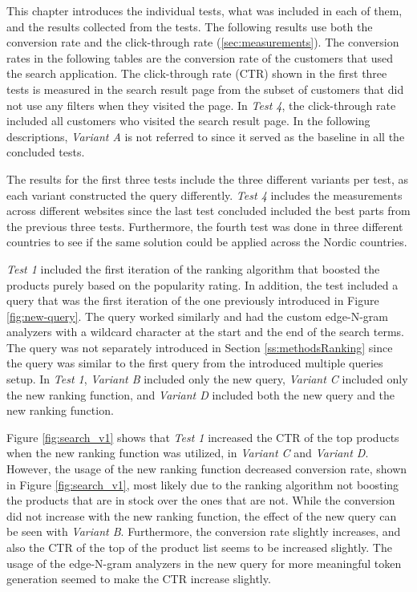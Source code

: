 

This chapter introduces the individual tests, what was included in each of them, and the results collected from the tests.
The following results use both the conversion rate and the click-through rate (\ref{sec:measurements}).
The conversion rates in the following tables are the conversion rate of the customers
that used the search application.
The click-through rate (CTR) shown in the first three tests is measured in the search result page from the subset of customers
that did not use any filters when they visited the page.
In \emph{Test 4}, the click-through rate included all customers who visited the search result page.
In the following descriptions, \emph{Variant A} is not referred to 
since it served as the baseline in all the concluded tests.


The results for the first three tests include the three different variants per test,
as each variant constructed the query differently.
\emph{Test 4} includes the measurements across different websites since the last test concluded included
the best parts from the previous three tests.
Furthermore, the fourth test was done in three different countries to see if the same solution could be applied
across the Nordic countries.


\emph{Test 1} included the first iteration of the ranking algorithm that boosted the products purely based
on the popularity rating.
In addition, the test included a query that was the first iteration of the one previously introduced in Figure \ref{fig:new-query}.
The query worked similarly and had the custom edge-N-gram analyzers with a wildcard character at the start and the end
of the search terms.
The query was not separately introduced in Section \ref{ss:methodsRanking} since the query was similar to the first query
from the introduced multiple queries setup.
In \emph{Test 1}, \emph{Variant B} included only the new query, \emph{Variant C} included only the new ranking function,
and \emph{Variant D} included both the new query and the new ranking function.

Figure \ref{fig:search_v1} shows that \emph{Test 1} increased the CTR of the top products when the new ranking function 
was utilized, in \emph{Variant C} and \emph{Variant D}.
However, the usage of the new ranking function decreased conversion rate, shown in Figure \ref{fig:search_v1}, most likely
due to the ranking algorithm not boosting the products that are in stock over the ones that are not.
While the conversion did not increase with the new ranking function, the effect of the new query can be seen with \emph{Variant B}.
Furthermore, the conversion rate slightly increases, and also the CTR of the top of the product list seems to be increased slightly.
The usage of the edge-N-gram analyzers in the new query for more meaningful token generation seemed to make the CTR increase
slightly. 


